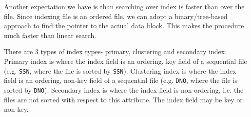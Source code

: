 \documentclass[a4paper, openany]{memoir}
\begin{document}
Another expectation we have is than searching over index is faster than over the file. Since indexing file is an ordered file, we can adopt a binary/tree-based approach to find the pointer to the actual data block. This makes the procedure much faster than linear search.

There are 3 types of index types- primary, clustering and secondary index. Primary index is where the index field is an ordering, key field of a sequential file (e.g. \texttt{SSN}, where the file is sorted by \texttt{SSN}). Clustering index is where the index field is an ordering, non-key field of a sequential file (e.g. \texttt{DNO}, where the file is sorted by \texttt{DNO}). Secondary index is where the index field is non-ordering, i.e. the files are not sorted with respect to this attribute. The index field may be key or non-key.
\end{document}
